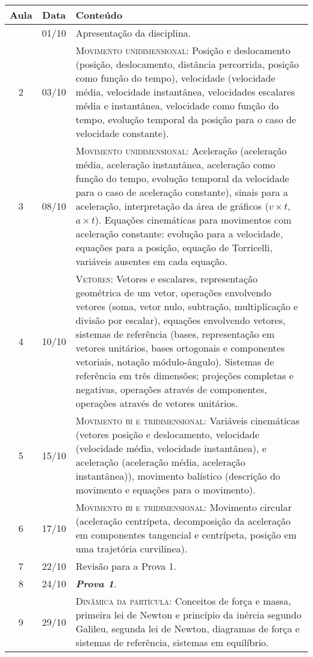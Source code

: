 \begin{center}
\begin{longtable}{ccp{70mm}}
\toprule
Aula & Data & Conteúdo \\
\midrule
\endhead
\bottomrule
\endfoot
1	 & 	01/10	 & 	Apresentação da disciplina. \\
2	 & 	03/10	 & 	\textsc{Movimento unidimensional:} Posição e deslocamento (posição, deslocamento, distância percorrida, posição como função do tempo), velocidade (velocidade média, velocidade instantânea, velocidades escalares média e instantânea, velocidade como função do tempo, evolução temporal da posição para o caso de velocidade constante). \\
3	 & 	08/10	 & 	\textsc{Movimento unidimensional:} Aceleração (aceleração média, aceleração instantânea, aceleração como função do tempo, evolução temporal da velocidade para o caso de aceleração constante), sinais para a aceleração, interpretação da área de gráficos ($v \times t$, $a \times  t$). Equações cinemáticas para movimentos com aceleração constante: evolução para a velocidade, equações para a posição, equação de Torricelli, variáveis ausentes em cada equação. \\
4	 & 	10/10	 & 	\textsc{Vetores:} Vetores e escalares, representação geométrica de um vetor, operações envolvendo vetores (soma, vetor nulo, subtração, multiplicação e divisão por escalar), equações envolvendo vetores, sistemas de referência (bases, representação em vetores unitários, bases ortogonais e componentes vetoriais, notação módulo-ângulo). Sistemas de referência em três dimensões; projeções completas e negativas, operações através de componentes, operações através de vetores unitários. \\
5	 & 	15/10	 &  \textsc{Movimento bi e tridimensional:} Variáveis cinemáticas (vetores posição e deslocamento, velocidade (velocidade média, velocidade instantânea), e aceleração (aceleração média, aceleração instantânea)), movimento balístico (descrição do movimento e equações para o movimento). \\
6	 & 	17/10	 & 	\textsc{Movimento bi e tridimensional:} Movimento circular (aceleração centrípeta, decomposição da aceleração em componentes tangencial e centrípeta, posição em uma trajetória curvilínea). \\
7	 & 	22/10	 & 	Revisão para a Prova 1. \\
8	 & 	24/10	 & 	\textbf{\textit{Prova 1}}. \\
9	 & 	29/10	 & 	\textsc{Dinâmica da partícula:} Conceitos de força e massa, primeira lei de Newton e princípio da inércia segundo Galileu, segunda lei de Newton, diagramas de força e sistemas de referência, sistemas em equilíbrio. \\

\end{longtable}
\end{center}
